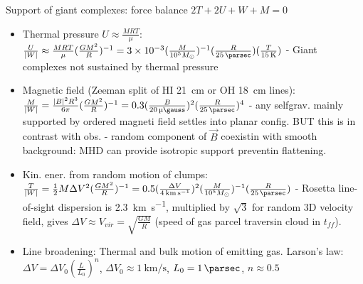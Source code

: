 \begin{frame}{Support of giant complexes: force balance $2T+2U+W+M=0$}
    \begin{itemize}
        \item Thermal pressure $U\approx \frac{MRT}{\mu}$: $\frac{U}{|W|}\approx \frac{MRT}{\mu}(\frac{GM^2}{R})^{-1}=\num{3e-3}(\frac{M}{\num{e5}\msun{}})^{-1}(\frac{R}{\SI{25}{\parsec}})(\frac{T}{\SI{15}{\kelvin}})$ - Giant complexes not sustained by thermal pressure
        \item Magnetic field (Zeeman split of HI \SI{21}{\cm} or OH \SI{18}{\cm} lines): $\frac{M}{|W|}=\frac{|B|^2R^3}{6\pi}(\frac{GM^2}{R})^{-1}=0.3(\frac{B}{\SI{20}{\micro\gauss}})^2(\frac{R}{\SI{25}{\parsec}})^4$ - any selfgrav. mainly supported by ordered magneti field settles into planar config. BUT this is in contrast with obs. - random component of $\vec{B}$ coexistin with smooth background: MHD can provide isotropic support preventin flattening.
        \item Kin. ener. from random motion of clumps: $\frac{T}{|W|}=\frac{1}{2}M\Delta V^2(\frac{GM^2}{R})^{-1}=0.5(\frac{\Delta V}{\SI{4}{\kilo\meter\per\second}})^2(\frac{M}{\num{e5}\msun{}})^{-1}(\frac{R}{\SI{25}{\parsec}})$ - Rosetta line-of-sight dispersion is \SI{2.3}{\kilo\meter\per\second}, multiplied by $\sqrt{3}$ for random 3D velocity field, gives $\Delta V\approx V_{vir}=\sqrt{\frac{GM}{R}}$ (speed of gas parcel traversin cloud in $t_{ff}$).
        \item Line broadening: Thermal and bulk motion of emitting gas. Larson's law: $\Delta V=\Delta V_0(\frac{L}{L_0})^n$, $\Delta V_0\approx\SI{1}{\kilo\meter\per\second}$, $L_0=\SI{1}{\parsec}$, $n\approx0.5$
        \end{itemize}
\end{frame}

